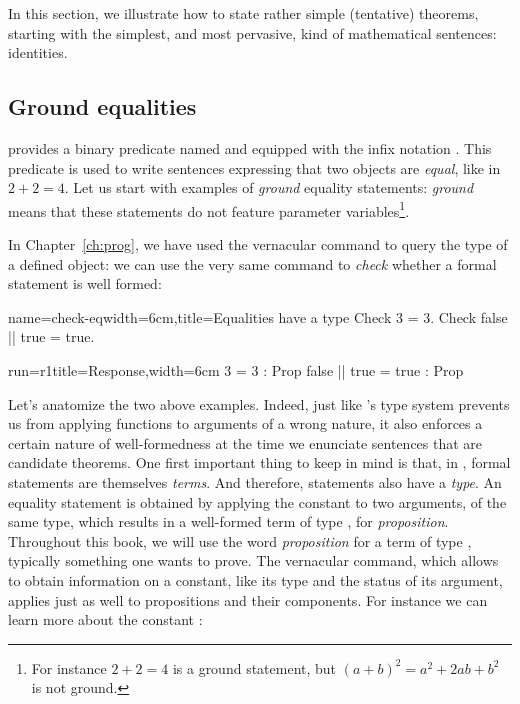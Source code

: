 

In this section, we illustrate how to state rather simple (tentative)
theorems, starting with the simplest, and most pervasive, kind of
mathematical sentences: identities.

\subsection{Ground equalities}\label{ssec:groundeq}

\Coq{} provides a binary predicate named  and equipped with the
infix notation \C{=}. This predicate is used to write sentences
expressing that two objects are \emph{equal}, like in $2 + 2 = 4$.
Let us start with examples of \Coq{} \emph{ground} equality
statements: \emph{ground} means that these statements do not feature
parameter variables\footnote{For instance $2 + 2 = 4$ is a ground
  statement, but $(a + b)^2 = a^2 + 2ab + b^2$ is not ground.}.

In Chapter~\ref{ch:prog}, we have used the 
vernacular command to query the type of a defined object: we can use
the very same command to \emph{check} whether a formal statement
is well formed:

\begin{coq}{name=check-eq}{width=6cm,title=Equalities have a type}
Check 3 = 3.
Check false || true = true.
\end{coq}
\begin{coqout}{run=r1}{title=Response,width=6cm}
3 = 3 : Prop
false || true = true : Prop
\end{coqout}

Let's anatomize the two above examples. Indeed, just like \Coq{}'s
type system prevents us from applying functions to
arguments of a wrong nature, it also enforces a certain nature of
well-formedness at the time we enunciate sentences that are candidate
theorems. One first important thing to
keep in mind is that, in \Coq{}, formal statements are themselves
\emph{terms}. And therefore, statements also have a \emph{type}. An
equality statement is obtained by applying the constant  to two
arguments, of the same type, which results in a well-formed term of
type , for \emph{proposition}. Throughout this book, we will
use the word \emph{proposition} for a term of type , typically
something one wants to prove. The  vernacular
command, which allows to obtain information on a constant, like its
type and the status of its argument, applies just as well to
propositions and their components. For instance we can learn more
about the constant :

